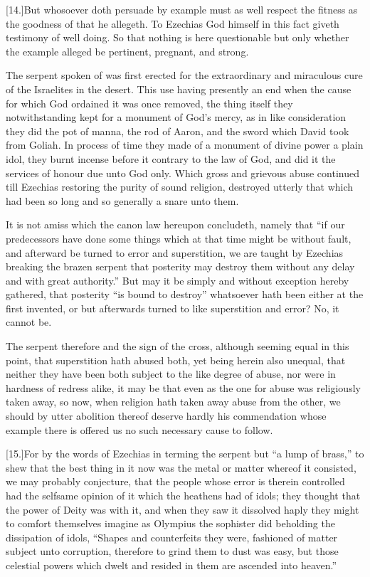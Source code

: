 [14.]But whosoever doth persuade by example must as well respect the fitness as the goodness of that he allegeth. To Ezechias God himself in this fact giveth testimony of well doing. So that nothing is here questionable but only whether the example alleged be pertinent, pregnant, and strong.

The serpent spoken of was first erected for the extraordinary and miraculous cure of the Israelites in the desert. This use having presently an end when the cause for which God  ordained it was once removed, the thing itself they notwithstanding kept for a monument of God’s mercy, as in like consideration they did the pot of manna, the rod of Aaron, and the sword which David took from Goliah.
 In process of time they made of a monument of divine power a plain idol, they burnt incense before it contrary to the law of God, and did it the services of honour due unto God only. Which gross and grievous abuse continued till Ezechias restoring the purity of sound religion, destroyed utterly that which had been so long and so generally a snare unto them.

It is not amiss which the canon law hereupon concludeth, namely that “if our predecessors have done some things which at that time might be without fault, and afterward be turned to error and superstition, we are taught by Ezechias breaking the brazen serpent that posterity may destroy them without any delay and with great authority.” But may it be simply and without exception hereby gathered, that posterity “is bound to destroy” whatsoever hath been either at the first invented, or but afterwards turned to like superstition and error? No, it cannot be.

The serpent therefore and the sign of the cross, although seeming equal in this point, that superstition hath abused both, yet being herein also unequal, that neither they have been both subject to the like degree of abuse, nor were in hardness of redress alike, it may be that even as the one for abuse was religiously taken away, so now, when religion hath taken away abuse from the other, we should by utter abolition thereof deserve hardly his commendation whose example there is offered us no such necessary cause to follow.

[15.]For by the words of Ezechias in terming the serpent but “a lump of brass,” to shew that the best thing in it now was the metal or matter whereof it consisted, we may probably conjecture, that the people whose error is therein controlled had the selfsame opinion of it which the heathens had of  idols; they thought that the power of Deity was with it, and when they saw it dissolved haply they might to comfort themselves imagine as Olympius the sophister did beholding the dissipation of idols, “Shapes and counterfeits they were, fashioned of matter subject unto corruption, therefore to grind them to dust was easy, but those celestial powers which dwelt and resided in them are ascended into heaven.”

